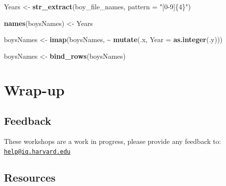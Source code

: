 \documentclass[
]{book}
\newenvironment{Shaded}{\begin{snugshade}}{\end{snugshade}}
\newcommand{\DataTypeTok}[1]{\textcolor[rgb]{0.13,0.29,0.53}{#1}}
\newcommand{\KeywordTok}[1]{\textcolor[rgb]{0.13,0.29,0.53}{\textbf{#1}}}
\newcommand{\NormalTok}[1]{#1}
\newcommand{\OperatorTok}[1]{\textcolor[rgb]{0.81,0.36,0.00}{\textbf{#1}}}
\newcommand{\StringTok}[1]{\textcolor[rgb]{0.31,0.60,0.02}{#1}}
\begin{document}
\begin{Shaded}
\begin{Highlighting}[]
\NormalTok{Years \textless{}{-}}\StringTok{ }\KeywordTok{str\_extract}\NormalTok{(boy\_file\_names, }\DataTypeTok{pattern =} \StringTok{"[0{-}9]\{4\}"}\NormalTok{)}

\KeywordTok{names}\NormalTok{(boysNames) \textless{}{-}}\StringTok{ }\NormalTok{Years}

\NormalTok{boysNames \textless{}{-}}\StringTok{ }\KeywordTok{imap}\NormalTok{(boysNames, }\OperatorTok{\textasciitilde{}}\StringTok{ }\KeywordTok{mutate}\NormalTok{(.x, }\DataTypeTok{Year =} \KeywordTok{as.integer}\NormalTok{(.y)))}

\NormalTok{boysNames \textless{}{-}}\StringTok{ }\KeywordTok{bind\_rows}\NormalTok{(boysNames)}
\end{Highlighting}
\end{Shaded}

\hypertarget{wrap-up-4}{%
\section{Wrap-up}\label{wrap-up-4}}

\hypertarget{feedback-4}{%
\subsection{Feedback}\label{feedback-4}}

These workshops are a work in progress, please provide any feedback to: \href{mailto:help@iq.harvard.edu}{\nolinkurl{help@iq.harvard.edu}}

\hypertarget{resources-5}{%
\subsection{Resources}\label{resources-5}}
\end{document}
